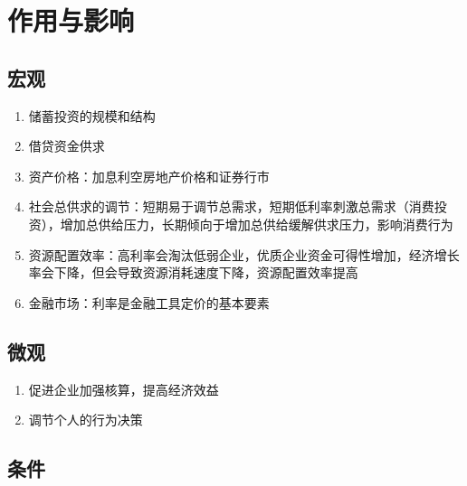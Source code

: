 \documentclass[12pt]{book}
\begin{document}
\section{作用与影响}

\subsection{宏观}

\begin{enumerate}[(1)]
    \item 储蓄投资的规模和结构
    \item 借贷资金供求
    \item 资产价格：加息利空房地产价格和证券行市
    \item 社会总供求的调节：短期易于调节总需求，短期低利率刺激总需求（消费投资），增加总供给压力，长期倾向于增加总供给缓解供求压力，影响消费行为
    \item 资源配置效率：高利率会淘汰低弱企业，优质企业资金可得性增加，经济增长率会下降，但会导致资源消耗速度下降，资源配置效率提高
    \item 金融市场：利率是金融工具定价的基本要素
\end{enumerate}


\subsection{微观}

\begin{enumerate}[(1)]
    \item 促进企业加强核算，提高经济效益
    \item 调节个人的行为决策
\end{enumerate}



\subsection{条件}
\end{document}

